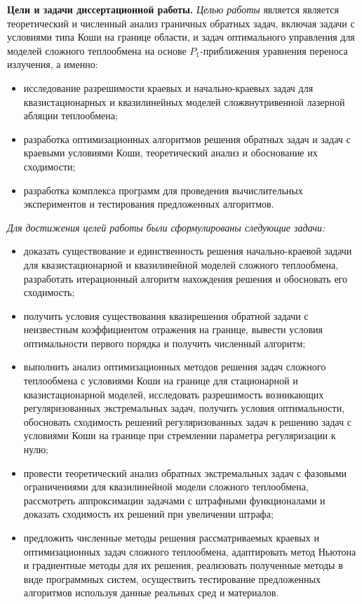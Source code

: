     \textbf{Цели и задачи диссертационной работы.}
    \textit{Целью работы} является является теоретический и численный анализ граничных
    обратных задач, включая задачи с условиями типа Коши на границе области,
    и задач оптимального управления для моделей сложного теплообмена на
    основе $P_1$-приближения уравнения переноса излучения, а именно:
    \begin{itemize}[leftmargin=5.5mm]
        \renewcommand\labelitemi{--}
        \item исследование разрешимости краевых и начально-краевых задач для
        квазистационарных и квазилинейных моделей сложвнутривенной лазерной абляции теплообмена;
        \item разработка оптимизационных алгоритмов решения обратных задач и задач
        с краевыми условиями Коши, теоретический анализ и обоснование их
        сходимости;
        \item разработка комплекса программ для проведения вычислительных
        экспериментов и тестирования предложенных алгоритмов.
    \end{itemize}
    \textit{Для достижения целей работы были сформулированы следующие задачи:}
    \begin{itemize}[leftmargin=5.5mm]
        \renewcommand\labelitemi{--}
        \item доказать существование и единственность решения начально-краевой
        задачи для квазистационарной и квазилинейной моделей сложного теплообмена,
        разработать итерационный алгоритм нахождения решения и обосновать его
        сходимость;
        \item получить условия существования квазирешения обратной задачи с
        неизвестным коэффициентом отражения на границе, вывести условия
        оптимальности первого порядка и получить численный алгоритм;
        \item выполнить анализ оптимизационных методов решения задач сложного
        теплообмена с условиями Коши на границе для стационарной и
        квазистационарной моделей, исследовать разрешимость возникающих
        регуляризованных экстремальных задач, получить условия оптимальности,
        обосновать сходимость решений регуляризованных задач к решению задач с
        условиями Коши на границе при стремлении параметра регуляризации к
        нулю;
        \item провести теоретический анализ обратных экстремальных задач с фазовыми
        ограничениями для квазилинейной модели сложного теплообмена,
        рассмотреть аппроксимации задачами с штрафными функционалами и
        доказать сходимость их решений при увеличении штрафа;
        \item предложить численные методы решения рассматриваемых краевых и
        оптимизационных задач сложного теплообмена, адаптировать метод
        Ньютона и градиентные методы для их решения, реализовать полученные
        методы в виде программных систем, осуществить тестирование
        предложенных алгоритмов используя данные реальных сред и материалов.
    \end{itemize}



